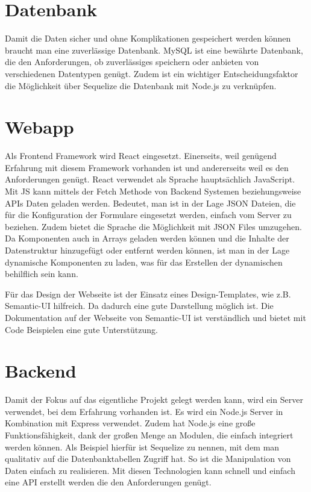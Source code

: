 \documentclass[a4paper,11pt]{scrreprt}
\begin{document}
\section{Datenbank}
Damit die Daten sicher und ohne Komplikationen gespeichert werden können braucht man eine zuverlässige Datenbank. MySQL ist eine bewährte Datenbank, die den Anforderungen, ob  zuverlässiges speichern oder anbieten von verschiedenen Datentypen genügt. Zudem ist ein wichtiger Entscheidungsfaktor die Möglichkeit über Sequelize die Datenbank mit Node.js zu verknüpfen. 

\section{Webapp}
Als Frontend Framework wird React eingesetzt. Einerseits, weil genügend Erfahrung mit diesem Framework vorhanden ist und andererseits weil es den Anforderungen genügt. 
React verwendet als Sprache hauptsächlich JavaScript. Mit JS kann mittels der Fetch Methode von Backend Systemen beziehungsweise APIs Daten geladen werden. Bedeutet, man ist in der Lage JSON Dateien, die für die Konfiguration der Formulare eingesetzt werden, einfach vom Server zu beziehen. Zudem bietet die Sprache die Möglichkeit mit JSON Files umzugehen. Da Komponenten auch in Arrays geladen werden können und die Inhalte der Datenstruktur hinzugefügt oder entfernt werden können, ist man in der Lage dynamische Komponenten zu laden, was für das Erstellen der dynamischen behilflich sein kann. 


Für das Design der Webseite ist der Einsatz eines Design-Templates, wie z.B. Semantic-UI
hilfreich. Da dadurch eine gute Darstellung möglich ist. 
Die Dokumentation auf der Webseite von Semantic-UI ist verständlich und
bietet mit Code Beispielen eine gute Unterstützung.
\\
\section{Backend}
Damit der Fokus auf das eigentliche Projekt gelegt werden kann, wird ein Server verwendet, bei dem Erfahrung vorhanden ist. Es wird ein Node.js Server in Kombination mit Express verwendet. Zudem hat Node.js eine große Funktionsfähigkeit, dank der großen Menge an Modulen, die einfach integriert werden können. Als Beispiel hierfür ist Sequelize zu nennen, mit dem man qualitativ auf die Datenbanktabellen Zugriff hat. So ist die Manipulation von Daten einfach zu realisieren. Mit diesen Technologien kann schnell und einfach eine API erstellt werden die den Anforderungen genügt.
\end{document}
